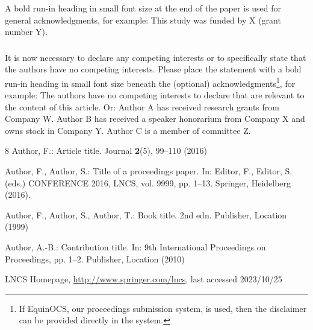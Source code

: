 \documentclass[runningheads]{llncs}
\begin{document}
    

\begin{credits}
\subsubsection{\ackname} A bold run-in heading in small font size at the end of the paper is
used for general acknowledgments, for example: This study was funded
by X (grant number Y).

\subsubsection{\discintname}
It is now necessary to declare any competing interests or to specifically
state that the authors have no competing interests. Please place the
statement with a bold run-in heading in small font size beneath the
(optional) acknowledgments\footnote{If EquinOCS, our proceedings submission
system, is used, then the disclaimer can be provided directly in the system.},
for example: The authors have no competing interests to declare that are
relevant to the content of this article. Or: Author A has received research
grants from Company W. Author B has received a speaker honorarium from
Company X and owns stock in Company Y. Author C is a member of committee Z.
\end{credits}


%
%
%
% 
% 
%
\begin{thebibliography}{8}
Author, F.: Article title. Journal \textbf{2}(5), 99--110 (2016)

Author, F., Author, S.: Title of a proceedings paper. In: Editor,
F., Editor, S. (eds.) CONFERENCE 2016, LNCS, vol. 9999, pp. 1--13.
Springer, Heidelberg (2016). 

Author, F., Author, S., Author, T.: Book title. 2nd edn. Publisher,
Location (1999)

Author, A.-B.: Contribution title. In: 9th International Proceedings
on Proceedings, pp. 1--2. Publisher, Location (2010)

LNCS Homepage, \url{http://www.springer.com/lncs}, last accessed 2023/10/25
\end{thebibliography}
\end{document}
